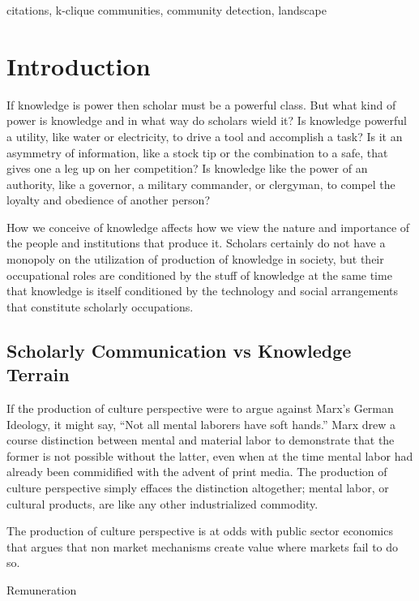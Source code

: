 \documentclass[]{book}
\theoremstyle{definition}
\theoremstyle{definition}
\theoremstyle{definition}
\theoremstyle{remark}
\begin{document}
citations, k-clique communities, community detection,
landscape

\hypertarget{introduction-1}{%
\section{Introduction}\label{introduction-1}}

If knowledge is power then scholar must be a powerful class. But what
kind of power is knowledge and in what way do scholars wield it? Is
knowledge powerful a utility, like water or electricity, to drive a tool
and accomplish a task? Is it an asymmetry of information, like a stock
tip or the combination to a safe, that gives one a leg up on her
competition? Is knowledge like the power of an authority, like a
governor, a military commander, or clergyman, to compel the loyalty and
obedience of another person?

How we conceive of knowledge affects how we view the nature and
importance of the people and institutions that produce it. Scholars
certainly do not have a monopoly on the utilization of production of
knowledge in society, but their occupational roles are conditioned by
the stuff of knowledge at the same time that knowledge is itself
conditioned by the technology and social arrangements that constitute
scholarly occupations.

\hypertarget{scholarly-communication-vs-knowledge-terrain}{%
\subsection{Scholarly Communication vs Knowledge
Terrain}\label{scholarly-communication-vs-knowledge-terrain}}

If the production of culture perspective were to argue against Marx's
German Ideology, it might say, ``Not all mental laborers have soft
hands.'' Marx drew a course distinction between mental and material
labor to demonstrate that the former is not possible without the latter,
even when at the time mental labor had already been commidified with the
advent of print media. The production of culture perspective simply
effaces the distinction altogether; mental labor, or cultural products,
are like any other industrialized commodity.

The production of culture perspective is at odds with public sector
economics that argues that non market mechanisms create value where
markets fail to do so. \citep{Hayes2000Assessing}

Remuneration
\end{document}
